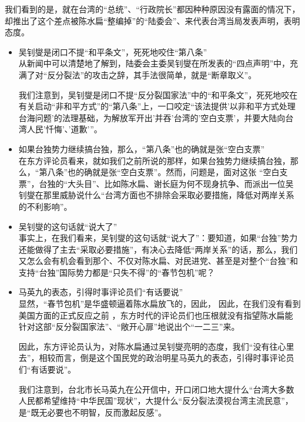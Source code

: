 \documentclass[a4paper,11pt]{article}
\begin{document}
\begin{itemize}
  我们看到的是，就在台湾的“总统”、“行政院长”都因种种原因没有露面的情况下，却推出了这个差点被陈水扁“整编掉”的“陆委会”、来代表台湾当局发表声明，表明态度。
 
\begin{itemize}

\item 吴钊燮是闭口不提“和平条文”，死死地咬住“第八条”\\
\label{sec-2_3_1}%
从新闻中可以清楚地了解到，陆委会主委吴钊燮在所发表的“四点声明”中，充满了对“反分裂法”的攻击之辞，其手法很简单，就是“断章取义”。

    我们注意到，吴钊燮是闭口不提“反分裂国家法”中的“和平条文”，死死地咬在有关启动“非和平方式”的“第八条”上，一口咬定“该法提供'以非和平方式处理台海问题'的法理基础，为解放军开出'并吞'台湾的'空白支票'，并要大陆向台湾人民'忏悔'、'道歉'”。
 

\item 如果台独势力继续搞台独，那么，“第八条”也的确就是张“空白支票”\\
\label{sec-2_3_2}%
在东方评论员看来，就如我们之前所说的那样，如果台独势力继续搞台独，那么，“第八条”也的确就是张“空白支票”。然而，问题是，面对这张 “空白支票”，台独的“大头目”、比如陈水扁、谢长庭为何不现身抗争、而派出一位吴钊燮在那里威胁说什么“台湾方面也不排除会采取必要措施，降低对两岸关系的不利影响”。
 

\item 吴钊燮的这句话就“说大了”\\
\label{sec-2_3_3}%
事实上，在我们看来，吴钊燮的这句话就“说大了”：要知道，如果“台独”势力还能做得了主去“采取必要措施”，有决心去降低“两岸关系”的话，那么，我们又怎么会有机会看到那个、不仅对陈水扁、对民进党、甚至是对整个“台独”和支持“台独”国际势力都是“只失不得”的“春节包机”呢？



\item 马英九的表态，引得时事评论员们“有话要说”\\
\label{sec-2_3_4}%
显然，“春节包机”是华盛顿逼着陈水扁放飞的，因此，
    因此，在我们没有看到美国方面的正式反应之前 ，东方时代的评论员们也压根就没有指望陈水扁能针对这部“反分裂国家法”、“敞开心扉”地说出个“一二三”来。

    因此，东方评论员认为，对陈水扁通过吴钊燮亮明的态度，我们“没有往心里去”，相较而言，倒是这个国民党的政治明星马英九的表态，引得时事评论员们“有话要说”。

    我们注意到，台北市长马英九在公开信中，开口闭口地大提什么“台湾大多数人民都希望维持“中华民国”现状”，大提什么“反分裂法漠视台湾主流民意”，是“既无必要也不明智，反而激起反感”。


\end{itemize}
\end{itemize}
\end{document}
